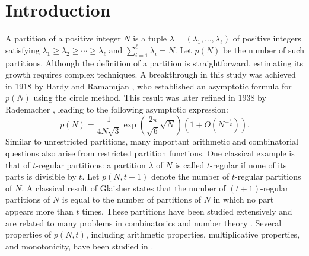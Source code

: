\documentclass[11pt]{amsart}
\theoremstyle{plain}
\numberwithin{equation}{section}
\begin{document}
	\section{Introduction}\label{section1} 	
	A partition of a positive integer $N$ is a tuple $\lambda = (\lambda_1, \ldots, \lambda_\ell)$ of positive integers satisfying $\lambda_1 \ge \lambda_2 \ge \cdots \ge \lambda_\ell$ and $\sum_{i=1}^{\ell} \lambda_i = N$. Let $p(N)$ be the number of such partitions. Although the definition of a partition is straightforward, estimating its growth requires complex techniques. A breakthrough in this study was achieved in 1918 by Hardy and Ramanujan \cite{hardy1918asymptotic}, who established an asymptotic formula for $p(N)$ using the circle method. This result was later refined in 1938 by Rademacher \cite{rademacher1938partition}, leading to the following asymptotic expression:
	\begin{equation}\label{eq-hardy}
		p(N) = \frac{1}{4N\sqrt{3}} \exp\left( \frac{2\pi}{\sqrt{6}}\sqrt{N}\right) \left(1 + O\left(N^{-\frac{1}{2}}\right)\right).
	\end{equation}
	Similar to unrestricted partitions, many important arithmetic and combinatorial questions also arise from restricted partition functions. One classical example is that of 
	$t$-regular partitions:
	a partition $\lambda$ of $N$ is called $t$-regular if none of its parts is divisible by $t$. Let $p(N,t-1)$ denote the number of $t$-regular partitions of $N$. A classical result of Glaisher \cite{Glaisher1883} states that the number of $(t+1)$-regular partitions of $N$ is equal to the number of partitions of $N$ in which no part appears more than $t$ times. These partitions have been studied extensively and are related to many problems in combinatorics and number theory \cite{bhowmik2025number, mc2012hardy,mcspirit2023zeros}. Several properties of $p(N,t)$, including arithmetic properties,  multiplicative properties, and monotonicity, have been studied in \cite{barman2024arithmetic,beckwith2016multiplicative, keith2014congruences, singh2023proofs, singh2025hook}.
	
\end{document}
